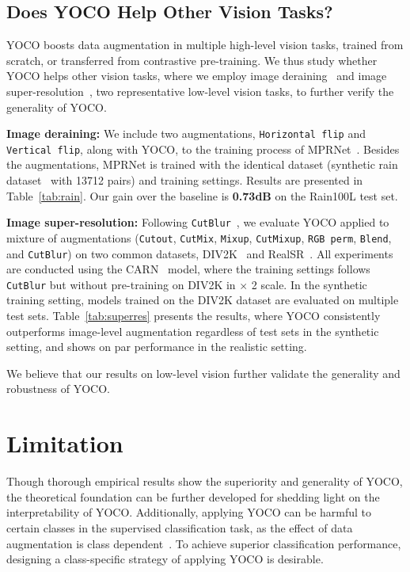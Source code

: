 \documentclass{article}
\begin{document}
\subsection{Does YOCO Help Other Vision Tasks?}
YOCO boosts data augmentation in multiple high-level vision tasks, trained from scratch, or transferred from contrastive pre-training. We thus study whether YOCO helps other vision tasks, where we employ image deraining~\cite{Zamir2021MPRNet,han2021bid} and image super-resolution~\cite{yoo2020rethinking}, two representative low-level vision tasks, to further verify the generality of YOCO. 

\textbf{Image deraining:} We include two augmentations, \texttt{Horizontal flip} and \texttt{Vertical flip}, along with YOCO, to the training process of MPRNet~\cite{Zamir2021MPRNet}. Besides the augmentations, MPRNet is trained with the identical dataset (synthetic rain dataset~\cite{Zamir2021MPRNet} with 13712 pairs) and training settings. Results are presented in Table~\ref{tab:rain}. Our gain over the baseline is \textbf{0.73dB} on the Rain100L test set. 


\textbf{Image super-resolution:}
Following \texttt{CutBlur}~\cite{yoo2020rethinking}, we evaluate YOCO applied to mixture of augmentations (\texttt{Cutout}, \texttt{CutMix}, \texttt{Mixup}, \texttt{CutMixup}, \texttt{RGB perm}, \texttt{Blend}, and \texttt{CutBlur}) on two common datasets, DIV2K~\cite{agustsson2017ntire} and RealSR~\cite{cai2019toward}. All experiments are conducted using the CARN~\cite{ahn2018fast} model, where the training settings follows \texttt{CutBlur} but without pre-training on DIV2K in $\times$ 2 scale. In the synthetic training setting, models trained on the DIV2K dataset are evaluated on multiple test sets.
Table~\ref{tab:superres} presents the results, where
YOCO consistently outperforms image-level augmentation regardless of test sets in the synthetic setting, and shows on par performance in the realistic setting. 


We believe that our results on low-level vision further validate the generality and robustness of YOCO. 

\section{Limitation}
Though thorough empirical results show the superiority and generality of YOCO, the theoretical foundation can be further developed for shedding light on the interpretability of YOCO. Additionally, applying YOCO can be harmful to certain classes in the supervised classification task, as the effect of data augmentation is class dependent~\cite{balestriero2022effects}. To achieve superior classification performance, designing a class-specific strategy of applying YOCO is desirable.
\end{document}
